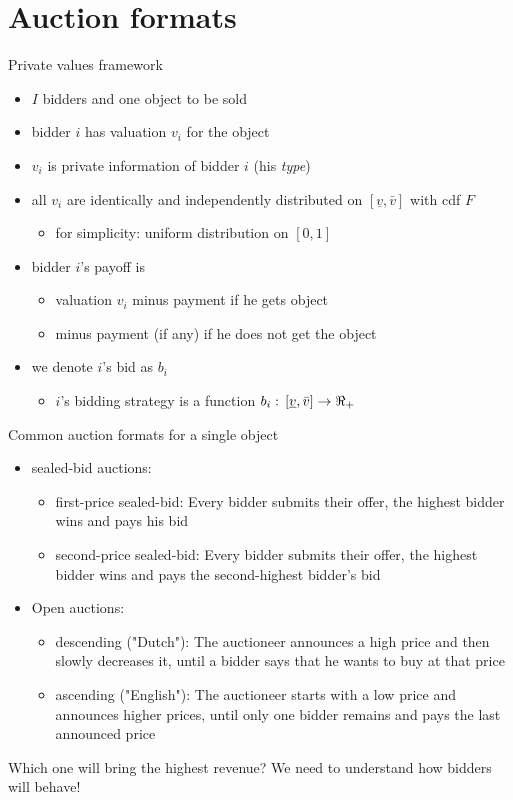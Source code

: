 \documentclass[bigger]{beamer}
\begin{document}
\section{Auction formats}
\label{sec:org6253901}
\begin{frame}[label={sec:orge7b91b3}]{Private values framework}
\begin{itemize}
\item \(I\) bidders and one object to be sold
\item bidder \(i\) has valuation \(v_i\) for the object
\item \(v_i\) is private information of bidder \(i\) (his \emph{type})
\item all \(v_i\) are identically and independently distributed on \([\underline v,\bar v]\) with cdf \(F\)
\begin{itemize}
\item for simplicity: uniform distribution on \([0,1]\)
\end{itemize}
\item bidder \(i\)'s payoff is
\begin{itemize}
\item valuation \(v_i\) minus payment if he gets object
\item minus payment (if any) if he does not get the object
\end{itemize}
\item we denote \(i\)'s bid as \(b_i\)
\begin{itemize}
\item \(i\)'s bidding strategy is a function \(b_i:\,[\underline v,\bar v]\rightarrow \Re_+\)
\end{itemize}
\end{itemize}
\end{frame}

\begin{frame}[label={sec:org63c6fe1}]{Common auction formats for a single object}
\begin{itemize}
\item sealed-bid auctions:
\begin{itemize}
\item first-price sealed-bid: Every bidder submits their offer, the highest bidder wins and pays his bid
\item second-price sealed-bid: Every bidder submits their offer, the highest bidder wins and pays the second-highest bidder’s bid
\end{itemize}
\item Open auctions:
\begin{itemize}
\item descending ("Dutch"): The auctioneer announces a high price and then slowly decreases it, until a bidder says that he wants to buy at that price
\item ascending ("English"): The auctioneer starts with a low price and announces higher prices, until only one bidder remains and pays the last announced price
\end{itemize}
\end{itemize}
Which one will bring the highest revenue? \linebreak We need to understand how bidders will behave!
\end{frame}
\end{document}

